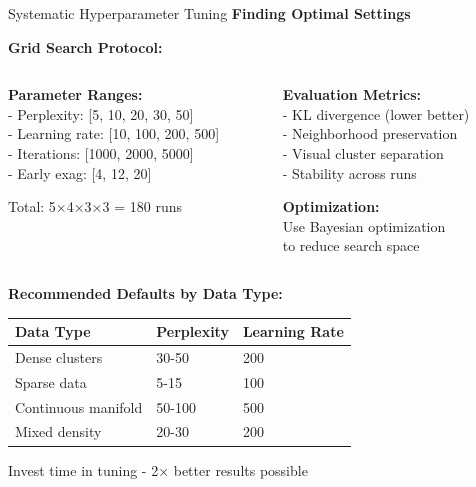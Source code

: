 \documentclass[10pt]{beamer}
\newcommand{\emphtext}[1]{\textcolor{upcblue}{\textbf{#1}}}
\newcommand{\conceptbox}[1]{\colorbox{upcblue!10}{\begin{minipage}{0.85\textwidth}\centering #1\end{minipage}}}
\begin{document}
\begin{frame}{Systematic Hyperparameter Tuning}
\emphtext{Finding Optimal Settings}

\vspace{0.3cm}
\textbf{Grid Search Protocol:}

\begin{columns}[T]
\begin{column}{0.48\textwidth}
\footnotesize
\textbf{Parameter Ranges:}\\
- Perplexity: [5, 10, 20, 30, 50]\\
- Learning rate: [10, 100, 200, 500]\\
- Iterations: [1000, 2000, 5000]\\
- Early exag: [4, 12, 20]

\vspace{0.2cm}
Total: 5×4×3×3 = 180 runs
\end{column}

\begin{column}{0.48\textwidth}
\footnotesize
\textbf{Evaluation Metrics:}\\
- KL divergence (lower better)\\
- Neighborhood preservation\\
- Visual cluster separation\\
- Stability across runs

\vspace{0.2cm}
\textbf{Optimization:}\\
Use Bayesian optimization\\
to reduce search space
\end{column}
\end{columns}

\vspace{0.3cm}
\textbf{Recommended Defaults by Data Type:}
\footnotesize
\begin{center}
\begin{tabular}{lll}
\toprule
\textbf{Data Type} & \textbf{Perplexity} & \textbf{Learning Rate} \\
\midrule
Dense clusters & 30-50 & 200 \\
Sparse data & 5-15 & 100 \\
Continuous manifold & 50-100 & 500 \\
Mixed density & 20-30 & 200 \\
\bottomrule
\end{tabular}
\end{center}

\begin{center}
\conceptbox{\footnotesize Invest time in tuning - 2× better results possible}
\end{center}
\end{frame}
\end{document}
